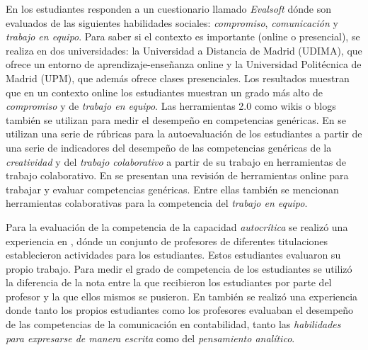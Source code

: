 En \cite{ruizacarate2013soft} los estudiantes responden a un cuestionario llamado \emph{Evalsoft} dónde son evaluados de las siguientes habilidades sociales: \emph{compromiso}, \emph{comunicación} y \emph{trabajo en equipo}. Para saber si el contexto es importante (online o presencial), se realiza en dos universidades: la Universidad a Distancia de Madrid (UDIMA), que ofrece un entorno de aprendizaje-enseñanza online y la Universidad Politécnica de Madrid (UPM), que además ofrece clases presenciales. Los resultados muestran que en un contexto online los estudiantes muestran un grado más alto de \emph{compromiso} y de \emph{trabajo en equipo}. Las herramientas 2.0 como wikis o blogs también se utilizan para medir el desempeño en competencias genéricas. En \cite{piedra2010measuring} se utilizan una serie de rúbricas para la autoevaluación de los estudiantes a partir de una serie de indicadores del desempeño de las competencias genéricas de la \emph{creatividad} y del \emph{trabajo colaborativo} a partir de su trabajo en herramientas de trabajo colaborativo. En \cite{mcloughlin2006beyond} se presentan una revisión de herramientas online para trabajar y evaluar competencias genéricas. Entre ellas también se mencionan herramientas colaborativas para la competencia del \emph{trabajo en equipo}. 

Para la evaluación de la competencia de la capacidad \emph{autocrítica} se realizó una experiencia en \cite{pinto2011assessment}, dónde un conjunto de profesores de diferentes titulaciones establecieron actividades para los estudiantes. Estos estudiantes evaluaron su propio trabajo. Para medir el grado de competencia de los estudiantes se utilizó la diferencia de la nota entre la que recibieron los estudiantes por parte del profesor y la que ellos mismos se pusieron. En \cite{sin2007evaluating} también se realizó una experiencia donde tanto los propios estudiantes como los profesores evaluaban el desempeño de las competencias de la comunicación en contabilidad, tanto las \emph{habilidades para expresarse de manera escrita} como del \emph{pensamiento analítico}.


